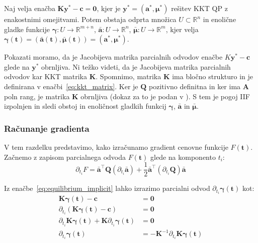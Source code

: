 \documentclass[mat2, tisk]{fmfdelo}
\newcommand{\aimplicit}{\bar{\mathbf{a}}}
\newcommand{\muimplicit}{\bar{\mathbf{\mu}}}
\newcommand{\yimplicit}{\mathbf{\gamma}}
\newcommand{\qmat}{\mathbf{Q}}
\newcommand{\kmat}{\mathbf{K}}
\newcommand{\avec}{\mathbf{a}}
\newcommand{\tvec}{\mathbf{t}}
\newcommand{\muvec}{\boldsymbol{\mu}}
\begin{document}
\begin{izrek} 
Naj velja enačba $\kmat\mathbf{y}^* - \mathbf{c} = \mathbf{0}$, kjer je $\mathbf{y}^* = (\mathbf{a}^*, \mathbf{\mu}^*)$ rešitev \ac{KKT} \ac{QP} z enakostnimi omejitvami. Potem obstaja odprta množica $U \subset \mathbb{R}^n$ in enolične gladke funkcije $\yimplicit : U \to \mathbb{R}^{m+n}$, $\aimplicit : U \to \mathbb{R}^{n}$, $\muimplicit : U \to \mathbb{R}^{m}$, kjer velja $\yimplicit(\tvec) = (\aimplicit(\tvec), \muimplicit(\tvec)) = (\avec^*, \muvec^*)$.
\end{izrek}

\begin{dokaz}
Pokazati moramo, da je Jacobijeva matrika parcialnih odvodov enačbe $K\mathbf{y}^* - \mathbf{c}$ glede na $\mathbf{y}^*$ obrnljiva. Ni težko videti, da je Jacobijeva matrika parcialnih odvodov kar \acs{KKT} matrika $\mathbf{K}$. Spomnimo, matrika $\kmat$ ima bločno strukturo in je definirana v enačbi~\eqref{eq:kkt_matrix}. Ker je $\mathbf{Q}$ pozitivno definitna in ker ima $\mathbf{A}$ poln rang, je matrika $\mathbf{K}$ obrnljiva (dokaz za to je podan v \cite{EPFL_Part5}). S tem je pogoj \acl{IIF} izpolnjen in sledi obstoj in enoličnost gladkih funkcij $\yimplicit$, $\aimplicit$ in $\muimplicit$.
\end{dokaz}

\subsubsection{Računanje gradienta}
\label{sec:grad}

V tem razdelku predstavimo, kako izračunamo gradient cenovne funkcije $F(\tvec)$. Začnemo z zapisom parcialnega odvoda $F(\tvec)$ glede na komponento $t_i$:
\begin{equation}
    \label{eq:grad}
    \partial_{t_i} F = \aimplicit^\top \qmat (\partial_{t_i} \aimplicit) + \frac{1}{2} \aimplicit^\top (\partial_{t_i} \qmat) \aimplicit
\end{equation}

Iz enačbe~\eqref{eq:equilibrium_implicit} lahko izrazimo parcialni odvod $\partial_{t_i} \yimplicit(\tvec)$ kot:
\begin{equation}
    \begin{aligned}
        \kmat \yimplicit(\tvec) - \mathbf{c} &= \mathbf{0} \\
        \partial_{t_i}(\kmat \yimplicit(\tvec) - \mathbf{c}) &= \mathbf{0} \\
        \partial_{t_i}\kmat \yimplicit(\tvec) + \kmat \partial_{t_i} \yimplicit(\tvec) &= \mathbf{0} \\
        \partial_{t_i} \yimplicit(\tvec) &= - \kmat^{-1} \partial_{t_i}\kmat \yimplicit(\tvec)
    \end{aligned}
\end{equation}
\end{document}
